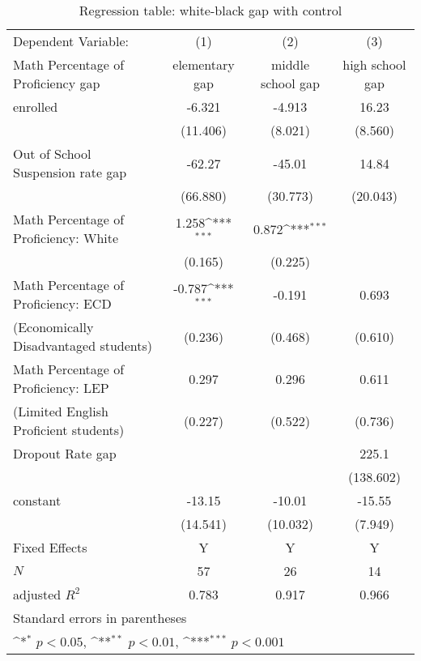 \begin{table}[H]\centering
\def\sym#1{\ifmmode^{#1}\else\(^{#1}\)\fi}
\caption{Regression table: white-black gap with control\label{tab1}}
\begin{tabular}{l*{3}{c}}
\hline\hline
  Dependent Variable:   &\multicolumn{1}{c}{(1)}&\multicolumn{1}{c}{(2)}&\multicolumn{1}{c}{(3)}\\
  Math Percentage of Proficiency gap           &\multicolumn{1}{c}{elementary gap}&\multicolumn{1}{c}{middle school gap}&\multicolumn{1}{c}{high school gap}\\
\hline
enrolled    &      -6.321         &       -4.913         &       16.23\\
            &     (11.406)         &     (8.021)         &     (8.560)         \\
[1em]
Out of School Suspension rate gap&       -62.27         &       -45.01         &       14.84         \\
            &     (66.880)         &     (30.773)         &     (20.043)         \\
[1em]
Math Percentage of Proficiency: White&       1.258\sym{***}         &       0.872\sym{***}         &        \\
            &     (0.165)         &     (0.225)         &            \\
[1em]
Math Percentage of Proficiency: ECD&       -0.787\sym{***}         &       -0.191         &       0.693  \\
(Economically Disadvantaged students) &     (0.236)         &     (0.468)         &     (0.610)         \\
[1em]
Math Percentage of Proficiency: LEP&      0.297       &       0.296  &      0.611         \\
(Limited English Proficient students)  &     (0.227)         &     (0.522)         &     (0.736)         \\
[1em]
Dropout Rate gap&              &       &      225.1      \\
            &             &             &     (138.602)         \\
[1em]
constant    &       -13.15         &       -10.01         &      -15.55\\
            &     (14.541)         &     (10.032)         &     (7.949)         \\
\hline
Fixed Effects   &    Y     &Y&Y \\
\hline
\(N\)       &          57         &          26         &          14         \\
adjusted \(R^{2}\)&      0.783         &       0.917         &       0.966         \\
\hline\hline
\multicolumn{4}{l}{\footnotesize Standard errors in parentheses}\\
\multicolumn{4}{l}{\footnotesize \sym{*} \(p<0.05\), \sym{**} \(p<0.01\), \sym{***} \(p<0.001\)}\\
\end{tabular}
\end{table}
